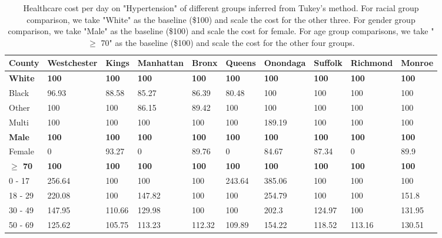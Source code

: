 \documentclass[10pt,twocolumn,letterpaper]{article}
\begin{document}
\begin{landscape}
\begin{table}[]
\small
\begin{center}
\begin{tabular}{|l|l|l|l|l|l|l|l|l|l|}
\hline
\textbf{County} & \textbf{Westchester} & \textbf{Kings} & \textbf{Manhattan} & \textbf{Bronx} & \textbf{Queens} & \textbf{Onondaga} & \textbf{Suffolk} & \textbf{Richmond} & \textbf{Monroe} \\ \hline
\textbf{White} & \textbf{100} & \textbf{100} & \textbf{100} & \textbf{100} & \textbf{100} & \textbf{100} & \textbf{100} & \textbf{100} & \textbf{100} \\ \hline
Black & 96.93 & 88.58 & 85.27 & 86.39 & 80.48 & 100 & 100 & 100 & 100 \\ \hline
Other & 100 & 100 & 86.15 & 89.42 & 100 & 100 & 100 & 100 & 100 \\ \hline
Multi & 100 & 100 & 100 & 100 & 100 & 189.19 & 100 & 100 & 100 \\ \hline
\textbf{Male} & \textbf{100} & \textbf{100} & \textbf{100} & \textbf{100} & \textbf{100} & \textbf{100} & \textbf{100} & \textbf{100} & \textbf{100} \\ \hline
Female & 0 & 93.27 & 0 & 89.76 & 0 & 84.67 & 87.34 & 0 & 89.9 \\ \hline
\textbf{$\ge$ 70} & \textbf{100} & \textbf{100} & \textbf{100} & \textbf{100} & \textbf{100} & \textbf{100} & \textbf{100} & \textbf{100} & \textbf{100} \\ \hline
0 - 17 & 256.64 & 100 & 100 & 100 & 243.64 & 385.06 & 100 & 100 & 100 \\ \hline
18 - 29 & 220.08 & 100 & 147.82 & 100 & 100 & 254.79 & 100 & 100 & 151.8 \\ \hline
30 - 49 & 147.95 & 110.66 & 129.98 & 100 & 100 & 202.3 & 124.97 & 100 & 131.95 \\ \hline
50 - 69 & 125.62 & 105.75 & 113.23 & 112.32 & 109.89 & 154.22 & 118.52 & 113.16 & 130.51 \\ \hline
\end{tabular}
\end{center}
\caption{Healthcare cost per day on "Hypertension" of different groups inferred from Tukey's method. For racial group comparison, we take "White" as the baseline (\$100) and scale the cost for the other three. For gender group comparison, we take "Male" as the baseline (\$100) and scale the cost for female. For age group comparisons, we take "$\ge$ 70" as the baseline (\$100) and scale the cost for the other four groups. }
\end{table}
\end{landscape}
\end{document}
